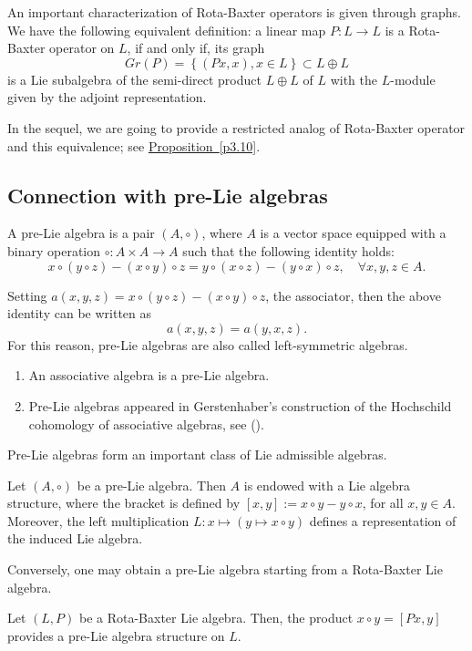 \documentclass[11pt, twoside]{article}
\begin{document}
    An important characterization of Rota-Baxter operators is given through graphs. We have the following  equivalent definition:  a linear map $P:L\to L$ is a Rota-Baxter operator on $L$, if and only if, its graph $$Gr(P)=\left\{ (Px,x), x\in L\right\}\subset L\oplus L $$ is a Lie subalgebra of the semi-direct product $L\oplus L$ of $L$ with the $L$-module given by the adjoint representation.

In the sequel, we are going to provide  a restricted analog of  Rota-Baxter operator and this equivalence; see \hyperref[p3.10]{Proposition~\ref*{p3.10}}.

\subsection{Connection with pre-Lie algebras}

\begin{defi}
    A pre-Lie algebra is a pair $(A,\circ) $, where $A$ is a vector space equipped with a binary operation $\circ : A\times A\to A $ such that the following identity holds: \begin{equation}
        x\circ (y\circ z)- (x\circ y)\circ z= y\circ(x\circ z) - (y\circ x)\circ z ,  \quad  \forall x,y,z\in A.
    \end{equation}
        
 Setting  $a(x,y,z)= x\circ (y\circ z) - (x\circ y)\circ z $, the associator,  then the above identity can be written as \begin{equation}\label{eq 1}
        a(x,y,z)=a(y,x,z) .
    \end{equation} For this reason, pre-Lie algebras are also called left-symmetric algebras. 
\end{defi}

\begin{ex}
    \begin{enumerate}
        \item An associative algebra is a pre-Lie algebra.
        \item Pre-Lie algebras appeared in Gerstenhaber's construction of the Hochschild cohomology of associative algebras, see (\cite{G63}). 
    \end{enumerate}
\end{ex}

Pre-Lie algebras form an important class of  Lie admissible algebras.

\begin{prop}
    Let $(A,\circ) $ be a pre-Lie algebra. Then $A$ is endowed with a Lie algebra structure, where the  bracket is defined by $[x,y]:= x\circ y - y\circ x $, for all $x,y\in A$. Moreover, the left multiplication $L:x\mapsto (y\mapsto x\circ y) $ defines a representation of the induced Lie algebra.
\end{prop}
Conversely, one may obtain a pre-Lie algebra starting from a Rota-Baxter Lie algebra.
\begin{prop}
    Let $(L,P)$ be a Rota-Baxter Lie algebra. Then, the product $x\circ y = [Px,y] $ provides a pre-Lie algebra structure on $L$. 
\end{prop}
\end{document}

